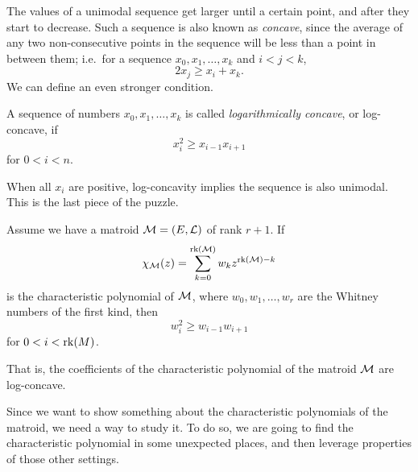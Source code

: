 \documentclass[12pt,oneside]{../../sfsuthesis}
\begin{document}
The values of a unimodal sequence get larger until a certain point, and after they start to decrease.
Such a sequence is also known as \emph{concave}, since the average of any two non-consecutive points in the sequence will be less than a point in between them;
i.e.\ for a sequence \( x_0, x_1, \dots, x_k \) and \( i < j < k \),
\[
    2x_j \geq x_i + x_k.
\]
We can define an even stronger condition.

\begin{definition}\th\label{def:logConcave}
    A sequence of numbers \( x_0, x_1, \dots, x_k \) is called \emph{logarithmically concave}, or log-concave, if
    \[
        x_i^2 \geq x_{i-1} x_{i+1}
    \]
    for \( 0 < i < n \).
\end{definition}

When all \( x_i \) are positive, log-concavity implies the sequence is also unimodal.
This is the last piece of the puzzle.

\begin{theorem}\th\label{thm:HRW}
    Assume we have a matroid \( \mathcal{M} = (E, \mathcal{L}) \) of rank \( r + 1 \).
    If
    \[
        \chi_{\mathcal{M}}(z) = \sum_{k=0}^{\operatorname{rk}(\mathcal{M})} w_k z^{\operatorname{rk}(\mathcal{M}) - k}
    \]
    is the characteristic polynomial of \( \mathcal{M} \), where \( w_0, w_1, \dots, w_r \) are the Whitney numbers of the first kind, then
    \[
        w_i^2 \geq w_{i-1}w_{i+1}
    \]
    for \( 0 < i < \operatorname{rk}(M) \).

    That is, the coefficients of the characteristic polynomial of the matroid \( \mathcal{M} \) are log-concave.
\end{theorem}

Since we want to show something about the characteristic polynomials of the matroid, we need a way to study it.
To do so, we are going to find the characteristic polynomial in some unexpected places, and then leverage properties of those other settings.
\end{document}
